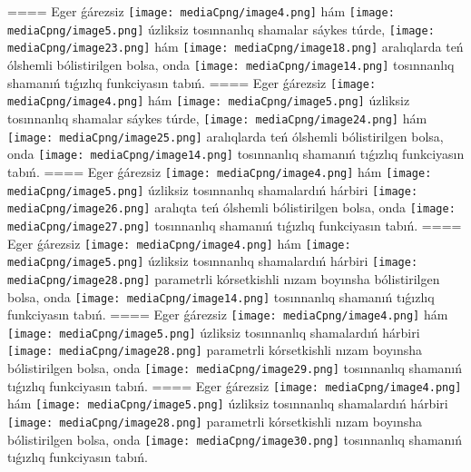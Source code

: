 ====
Eger ǵárezsiz \texttt{[image: mediaCpng/image4.png]} hám \texttt{[image: mediaCpng/image5.png]} úzliksiz tosınnanlıq shamalar sáykes túrde, \texttt{[image: mediaCpng/image23.png]} hám \texttt{[image: mediaCpng/image18.png]} aralıqlarda teń ólshemli bólistirilgen bolsa, onda \texttt{[image: mediaCpng/image14.png]} tosınnanlıq shamanıń tıǵızlıq funkciyasın tabıń.
====
Eger ǵárezsiz \texttt{[image: mediaCpng/image4.png]} hám \texttt{[image: mediaCpng/image5.png]} úzliksiz tosınnanlıq shamalar sáykes túrde, \texttt{[image: mediaCpng/image24.png]} hám \texttt{[image: mediaCpng/image25.png]} aralıqlarda teń ólshemli bólistirilgen bolsa, onda \texttt{[image: mediaCpng/image14.png]} tosınnanlıq shamanıń tıǵızlıq funkciyasın tabıń.
====
Eger ǵárezsiz \texttt{[image: mediaCpng/image4.png]} hám \texttt{[image: mediaCpng/image5.png]} úzliksiz tosınnanlıq shamalardıń hárbiri \texttt{[image: mediaCpng/image26.png]} aralıqta teń ólshemli bólistirilgen bolsa, onda \texttt{[image: mediaCpng/image27.png]} tosınnanlıq shamanıń tıǵızlıq funkciyasın tabıń.
====
Eger ǵárezsiz \texttt{[image: mediaCpng/image4.png]} hám \texttt{[image: mediaCpng/image5.png]} úzliksiz tosınnanlıq shamalardıń hárbiri \texttt{[image: mediaCpng/image28.png]} parametrli kórsetkishli nızam boyınsha bólistirilgen bolsa, onda \texttt{[image: mediaCpng/image14.png]} tosınnanlıq shamanıń tıǵızlıq funkciyasın tabıń.
====
Eger ǵárezsiz \texttt{[image: mediaCpng/image4.png]} hám \texttt{[image: mediaCpng/image5.png]} úzliksiz tosınnanlıq shamalardıń hárbiri \texttt{[image: mediaCpng/image28.png]} parametrli kórsetkishli nızam boyınsha bólistirilgen bolsa, onda \texttt{[image: mediaCpng/image29.png]} tosınnanlıq shamanıń tıǵızlıq funkciyasın tabıń.
====
Eger ǵárezsiz \texttt{[image: mediaCpng/image4.png]} hám \texttt{[image: mediaCpng/image5.png]} úzliksiz tosınnanlıq shamalardıń hárbiri \texttt{[image: mediaCpng/image28.png]} parametrli kórsetkishli nızam boyınsha bólistirilgen bolsa, onda \texttt{[image: mediaCpng/image30.png]} tosınnanlıq shamanıń tıǵızlıq funkciyasın tabıń.
